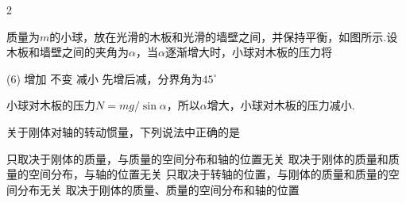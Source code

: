\begin{paracol}{2}
\begin{problem}
    质量为$m$的小球，放在光滑的木板和光滑的墙壁之间，并保持平衡，如图所示.设木板和墙壁之间的夹角为$\alpha$，当$\alpha$逐渐增大时，小球对木板的压力将
    \begin{tasks}(6)
        \task 增加
        \task 不变
        \task[\true] 减小
        \task* 先增后减，分界角为$45^{\circ}$
    \end{tasks}
\switchcolumn\vspace*{\fill}\centering
{}\vspace*{\fill}
\end{problem}
\end{paracol}
\begin{solution}
    小球对木板的压力$N=mg/\sin\alpha$，所以$\alpha$增大，小球对木板的压力减小.
\end{solution}

\begin{problem}
    关于刚体对轴的转动惯量，下列说法中正确的是
    \begin{tasks}
        \task 只取决于刚体的质量，与质量的空间分布和轴的位置无关
        \task 取决于刚体的质量和质量的空间分布，与轴的位置无关
        \task 只取决于转轴的位置，与刚体的质量和质量的空间分布无关
        \task[\true] 取决于刚体的质量、质量的空间分布和轴的位置
    \end{tasks}
\end{problem}

